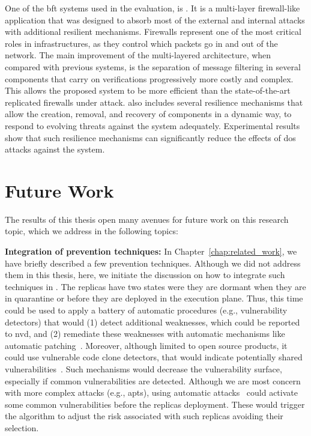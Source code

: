One of the \gls{bft} systems used in the \system evaluation, is \sieveq. 
It is a multi-layer firewall-like application that was designed to absorb most of the external and internal attacks with additional resilient mechanisms.
Firewalls represent one of the most critical roles in infrastructures, as they control which packets go in and out of the network.
The main improvement of the \sieveq multi-layered architecture, when compared with previous systems, is the separation of message filtering in several components that carry on verifications progressively more costly and complex.
This allows the proposed system to be more efficient than the state-of-the-art replicated firewalls under attack.
\sieveq also includes several resilience mechanisms that allow the creation, removal, and recovery of components in a dynamic way, to respond to evolving threats against the system adequately. Experimental results show that such resilience mechanisms can significantly reduce the effects of \gls{dos} attacks against the system.



\section{Future Work}
The results of this thesis open many avenues for future work on this research topic, which we address in the following topics:


\textbf{Integration of prevention techniques:}
In Chapter~\ref{chap:related_work}, we have briefly described a few prevention techniques.
Although we did not address them in this thesis, here, we initiate the discussion on how to integrate such techniques in \system.
The \system replicas have two states were they are dormant when they are in quarantine or before they are deployed in the execution plane.
Thus, this time could be used to apply a battery of automatic procedures (e.g., vulnerability detectors) that would (1) detect additional weaknesses, which could be reported to \gls{nvd}, and (2) remediate these weaknesses with automatic mechanisms like automatic patching~\cite{Huang:2016}.
Moreover, although limited to open source products, it could use vulnerable code clone detectors, that would indicate potentially shared vulnerabilities~\cite{Kim:2017a,Xu:2017b}.
Such mechanisms would decrease the vulnerability surface, especially if common vulnerabilities are detected.
Although we are most concern with more complex attacks (e.g., \gls{apts}), using automatic attacks~\cite{Hu:2015} could activate some common vulnerabilities before the replicas deployment.
These would trigger the algorithm to adjust the risk associated with such replicas avoiding their selection.


